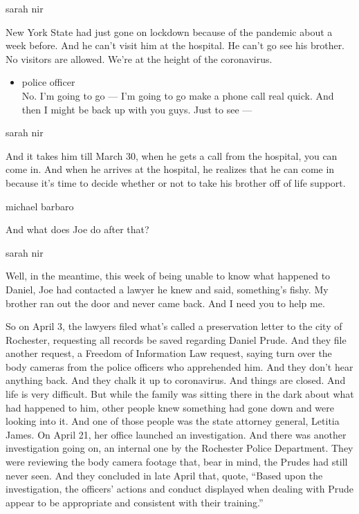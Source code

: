 sarah nir

New York State had just gone on lockdown because of the pandemic about a
week before. And he can't visit him at the hospital. He can't go see his
brother. No visitors are allowed. We're at the height of the
coronavirus.

\begin{itemize}
\tightlist
\item
  police officer\\
  No. I'm going to go --- I'm going to go make a phone call real quick.
  And then I might be back up with you guys. Just to see ---
\end{itemize}

sarah nir

And it takes him till March 30, when he gets a call from the hospital,
you can come in. And when he arrives at the hospital, he realizes that
he can come in because it's time to decide whether or not to take his
brother off of life support.

michael barbaro

And what does Joe do after that?

sarah nir

Well, in the meantime, this week of being unable to know what happened
to Daniel, Joe had contacted a lawyer he knew and said, something's
fishy. My brother ran out the door and never came back. And I need you
to help me.

So on April 3, the lawyers filed what's called a preservation letter to
the city of Rochester, requesting all records be saved regarding Daniel
Prude. And they file another request, a Freedom of Information Law
request, saying turn over the body cameras from the police officers who
apprehended him. And they don't hear anything back. And they chalk it up
to coronavirus. And things are closed. And life is very difficult. But
while the family was sitting there in the dark about what had happened
to him, other people knew something had gone down and were looking into
it. And one of those people was the state attorney general, Letitia
James. On April 21, her office launched an investigation. And there was
another investigation going on, an internal one by the Rochester Police
Department. They were reviewing the body camera footage that, bear in
mind, the Prudes had still never seen. And they concluded in late April
that, quote, ``Based upon the investigation, the officers' actions and
conduct displayed when dealing with Prude appear to be appropriate and
consistent with their training.''

